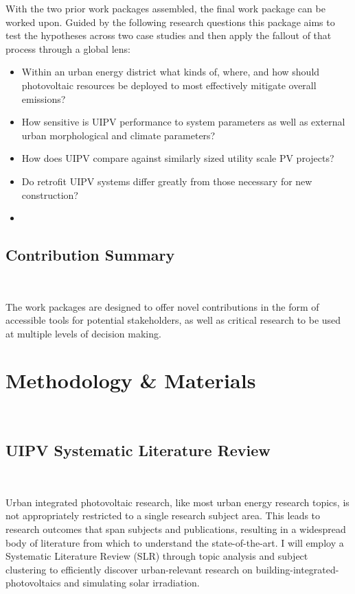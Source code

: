 With the two prior work packages assembled, the final work package can be worked upon. Guided by the following research questions this package aims to test the hypotheses across two case studies and then apply the fallout of that process through a global lens:

\begin{itemize}
    \item Within an urban energy district what kinds of, where, and how should photovoltaic resources be deployed to most effectively mitigate overall emissions?
    \item How sensitive is UIPV performance to system parameters as well as external urban morphological and climate parameters?
    \item How does UIPV compare against similarly sized utility scale PV projects?
    \item Do retrofit UIPV systems differ greatly from those necessary for new construction?
    \item 
\end{itemize}


\subsection{Contribution Summary}\

The work packages are designed to offer novel contributions in the form of accessible tools for potential stakeholders, as well as critical research to be used at multiple levels of decision making. 


\section{Methodology \& Materials}\




\subsection{UIPV Systematic Literature Review}\

Urban integrated photovoltaic research, like most urban energy research topics, is not appropriately restricted to a single research subject area. This leads to research outcomes that span subjects and publications, resulting in a widespread body of literature from which to understand the state-of-the-art. I will employ a Systematic Literature Review (SLR) through topic analysis and subject clustering to efficiently discover urban-relevant research on building-integrated-photovoltaics and simulating solar irradiation. 

